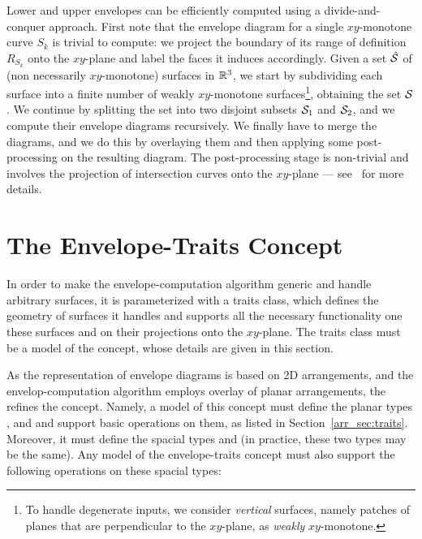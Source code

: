 Lower and upper envelopes can be efficiently computed using a
divide-and-conquer approach. First note that the envelope diagram for
a single $xy$-monotone curve $S_k$ is trivial to compute: we project
the boundary of its range of definition $R_{S_k}$ onto the $xy$-plane
and label the faces it induces accordingly. Given a set $\hat{{\cal S}}$
of (non necessarily $xy$-monotone) surfaces in $\mathbb{R}^3$, we start by
subdividing each surface into a finite number of weakly $xy$-monotone
surfaces\footnote{To handle degenerate inputs, we consider {\em vertical}
surfaces, namely patches of planes that are perpendicular to the
$xy$-plane, as {\em weakly} $xy$-monotone.}, obtaining the set ${\cal S}$.
We continue by splitting the set into two disjoint subsets ${\cal S}_1$
and ${\cal S}_2$, and we compute their envelope diagrams recursively.
We finally have to merge the diagrams, and we do this by overlaying
them and then applying some post-processing on the resulting diagram.
The post-processing stage is non-trivial and involves the projection
of intersection curves onto the $xy$-plane --- 
see~\cite{Michals_thesis} for more details.

\section{The Envelope-Traits Concept}

In order to make the envelope-computation algorithm generic and
handle arbitrary surfaces, it is parameterized with a traits class,
which defines the geometry of surfaces it handles and supports all
the necessary functionality one these surfaces and on their 
projections onto the $xy$-plane. The traits class must be a model
of the  concept, whose details are given in
this section.

As the representation of envelope diagrams is based on 2D
arrangements, and the envelop-computation algorithm employs overlay
of planar arrangements, the  refines the
 concept. Namely, a model of this concept
must define the planar types , 
and  and support basic operations on them, as listed
in Section~\ref{arr_sec:traits}. Moreover, it must define the spacial
types  and  (in practice,
these two types may be the same). Any model of the envelope-traits
concept must also support the following operations on these spacial
types:

